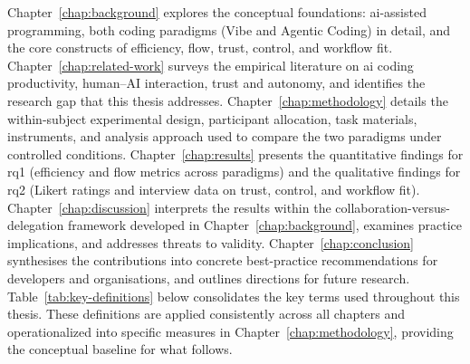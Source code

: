 Chapter~\ref{chap:background} explores the conceptual foundations: \gls{ai}-assisted programming, both coding paradigms (Vibe and Agentic Coding) in detail, and the core constructs of efficiency, flow, trust, control, and workflow fit. Chapter~\ref{chap:related-work} surveys the empirical literature on \gls{ai} coding productivity, human--AI interaction, trust and autonomy, and identifies the research gap that this thesis addresses. Chapter~\ref{chap:methodology} details the within-subject experimental design, participant allocation, task materials, instruments, and analysis approach used to compare the two paradigms under controlled conditions. Chapter~\ref{chap:results} presents the quantitative findings for \gls{rq1} (efficiency and flow metrics across paradigms) and the qualitative findings for \gls{rq2} (Likert ratings and interview data on trust, control, and workflow fit). Chapter~\ref{chap:discussion} interprets the results within the collaboration-versus-delegation framework developed in Chapter~\ref{chap:background}, examines practice implications, and addresses threats to validity. Chapter~\ref{chap:conclusion} synthesises the contributions into concrete best-practice recommendations for developers and organisations, and outlines directions for future research. Table~\ref{tab:key-definitions} below consolidates the key terms used throughout this thesis. These definitions are applied consistently across all chapters and operationalized into specific measures in Chapter~\ref{chap:methodology}, providing the conceptual baseline for what follows.

